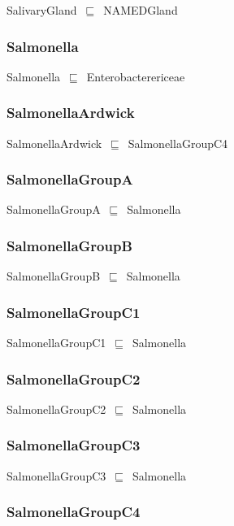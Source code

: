 \documentclass{article}
\begin{document}
SalivaryGland~\ensuremath{\sqsubseteq}~NAMEDGland~

\subsubsection*{Salmonella}

Salmonella~\ensuremath{\sqsubseteq}~Enterobacterericeae~

\subsubsection*{SalmonellaArdwick}

SalmonellaArdwick~\ensuremath{\sqsubseteq}~SalmonellaGroupC4~

\subsubsection*{SalmonellaGroupA}

SalmonellaGroupA~\ensuremath{\sqsubseteq}~Salmonella~

\subsubsection*{SalmonellaGroupB}

SalmonellaGroupB~\ensuremath{\sqsubseteq}~Salmonella~

\subsubsection*{SalmonellaGroupC1}

SalmonellaGroupC1~\ensuremath{\sqsubseteq}~Salmonella~

\subsubsection*{SalmonellaGroupC2}

SalmonellaGroupC2~\ensuremath{\sqsubseteq}~Salmonella~

\subsubsection*{SalmonellaGroupC3}

SalmonellaGroupC3~\ensuremath{\sqsubseteq}~Salmonella~

\subsubsection*{SalmonellaGroupC4}
\end{document}
